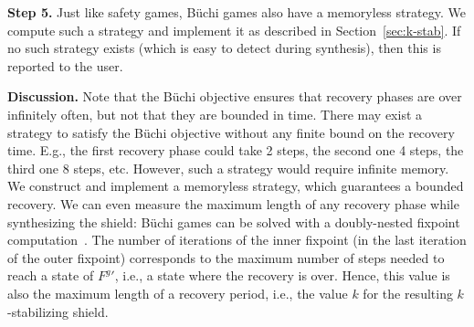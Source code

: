 \documentclass{llncs}
\newcommand{\buchi}{B\"uchi\xspace}
\begin{document}
\noindent
\textbf{Step 5.}  Just like safety games, \buchi games also have a 
memoryless strategy.  We compute such a strategy and implement it as 
described in Section~\ref{sec:k-stab}. If no such strategy exists (which 
is easy to detect during synthesis), then this is reported to the user.

\noindent
\textbf{Discussion.}
Note that the \buchi objective ensures that recovery phases are over 
infinitely often, but not that they are bounded in time.  There may 
exist a strategy to satisfy the \buchi objective without any finite 
bound on the recovery time.  E.g., the first recovery phase could take 2 
steps, the second one 4 steps, the third one 8 steps, etc.  However, 
such a strategy would require infinite memory. We construct and 
implement a memoryless strategy, which guarantees a bounded recovery.  
We can even measure the maximum length of any recovery phase while 
synthesizing the shield: \buchi games can be solved with a doubly-nested 
fixpoint computation~\cite{Mazala01}.  The number of iterations of the 
inner fixpoint (in the last iteration of the outer fixpoint) corresponds 
to the maximum number of steps needed to reach a state of ${F^g}'$, 
i.e., a state where the recovery is over.  Hence, this value is also the 
maximum length of a recovery period, i.e., the value $k$ for the 
resulting $k$-stabilizing shield.
\fi
\end{document}
